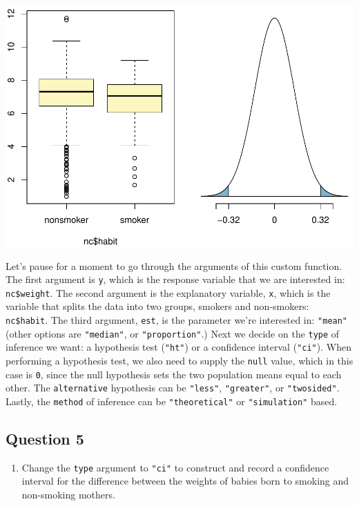 \documentclass[]{article}
\providecommand{\tightlist}{%
  \setlength{\itemsep}{0pt}\setlength{\parskip}{0pt}}
\begin{document}
\includegraphics{DATA_606_Lab_5_files/figure-latex/inf-weight-habit-ht-1.pdf}

Let's pause for a moment to go through the arguments of this custom
function. The first argument is \texttt{y}, which is the response
variable that we are interested in: \texttt{nc\$weight}. The second
argument is the explanatory variable, \texttt{x}, which is the variable
that splits the data into two groups, smokers and non-smokers:
\texttt{nc\$habit}. The third argument, \texttt{est}, is the parameter
we're interested in: \texttt{"mean"} (other options are
\texttt{"median"}, or \texttt{"proportion"}.) Next we decide on the
\texttt{type} of inference we want: a hypothesis test (\texttt{"ht"}) or
a confidence interval (\texttt{"ci"}). When performing a hypothesis
test, we also need to supply the \texttt{null} value, which in this case
is \texttt{0}, since the null hypothesis sets the two population means
equal to each other. The \texttt{alternative} hypothesis can be
\texttt{"less"}, \texttt{"greater"}, or \texttt{"twosided"}. Lastly, the
\texttt{method} of inference can be \texttt{"theoretical"} or
\texttt{"simulation"} based.

\subsection{Question 5}\label{question-5}

\begin{enumerate}
\def\labelenumi{\arabic{enumi}.}
\setcounter{enumi}{4}
\tightlist
\item
  Change the \texttt{type} argument to \texttt{"ci"} to construct and
  record a confidence interval for the difference between the weights of
  babies born to smoking and non-smoking mothers.
\end{enumerate}
\end{document}
